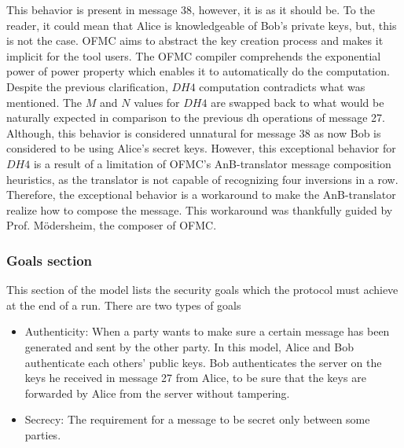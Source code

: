 This behavior is present in message 38, however, it is as it should be. To the reader, it could mean that Alice is knowledgeable of Bob's private keys, but, this is not the case. OFMC aims to abstract the key creation process and makes it implicit for the tool users. The OFMC compiler comprehends the exponential power of power property which enables it to automatically do the computation. Despite the previous clarification, $DH4$ computation contradicts what was mentioned. The $M$ and $N$ values for $DH4$ are swapped back to what would be naturally expected in comparison to the previous \gls{dh} operations of message 27. Although, this behavior is considered unnatural for message 38 as now Bob is considered to be using Alice's secret keys. However, this exceptional behavior for $DH4$ is a result of a limitation of OFMC's AnB-translator message composition heuristics, as the translator is not capable of recognizing four inversions in a row. Therefore, the exceptional behavior is a workaround to make the AnB-translator realize how to compose the message. This workaround was thankfully guided by Prof. M\"{o}dersheim, the composer of OFMC.
    
\subsubsection{Goals section}
This section of the model lists the security goals which the protocol must achieve at the end of a run. There are two types of goals
\begin{itemize}
	\item Authenticity: When a party wants to make sure a certain message has been generated and sent by the other party. In this model, Alice and Bob authenticate each others' public keys. Bob authenticates the server on the keys he received in message 27 from Alice, to be sure that the keys are forwarded by Alice from the server without tampering.
	\item Secrecy: The requirement for a message to be secret only between some parties.
\end{itemize}

%



